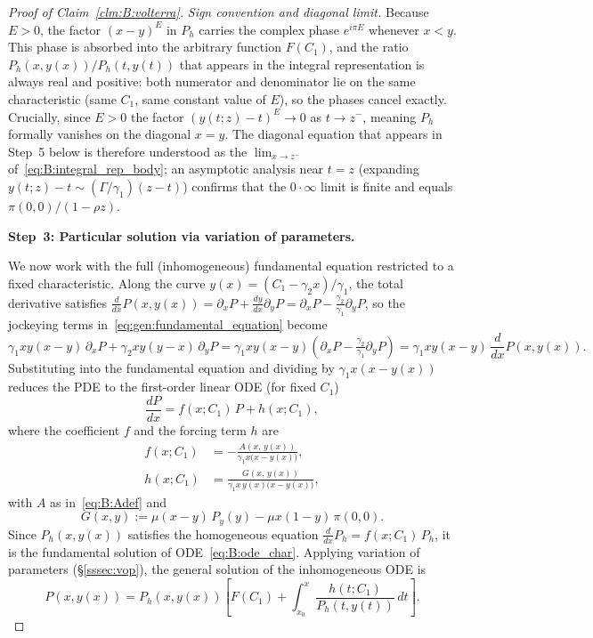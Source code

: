 \begin{proof}[Proof of Claim~\ref{clm:B:volterra}]
\smallskip\noindent\textit{Sign convention and diagonal limit.}
Because $E>0$, the factor $(x-y)^{E}$ in $P_h$ carries the complex phase
$e^{i\pi E}$ whenever $x<y$. This phase is absorbed into the arbitrary function
$F(C_1)$, and the ratio $P_h(x,y(x))/P_h(t,y(t))$ that appears in the integral
representation is always real and positive: both numerator and denominator lie on
the same characteristic (same $C_1$, same constant value of $E$), so the phases
cancel exactly.  Crucially, since $E>0$ the factor $(y(t;z)-t)^E\to0$ as
$t\to z^-$, meaning $P_h$ formally vanishes on the diagonal $x=y$.  The diagonal
equation that appears in Step~5 below is therefore understood as the
$\lim_{x\to z^-}$ of~\eqref{eq:B:integral_rep_body}; an asymptotic analysis near
$t=z$ (expanding $y(t;z)-t\sim(\Gamma/\gamma_1)(z-t)$) confirms that the
$0\cdot\infty$ limit is finite and equals $\pi(0,0)/(1-\rho z)$.

\medskip\noindent\textbf{Step~3: Particular solution via variation of parameters.}

We now work with the full (inhomogeneous) fundamental equation restricted to a
fixed characteristic.  Along the curve $y(x)=(C_1-\gamma_2 x)/\gamma_1$, the
total derivative satisfies $\frac{d}{dx}P(x,y(x)) = \partial_x P + \frac{dy}{dx}\partial_y P = \partial_x P - \frac{\gamma_2}{\gamma_1}\partial_y P$,
so the jockeying terms in~\eqref{eq:gen:fundamental_equation} become
\[
    \gamma_1 xy(x-y)\,\partial_x P + \gamma_2 xy(y-x)\,\partial_y P
    = \gamma_1 xy(x-y)\!\left(\partial_x P - \tfrac{\gamma_2}{\gamma_1}\partial_y P\right)
    = \gamma_1 xy(x-y)\,\frac{d}{dx}P(x,y(x)).
\]
Substituting into the fundamental equation and dividing by $\gamma_1 x(x-y(x))$
reduces the PDE to the first-order linear ODE (for fixed $C_1$)
\begin{equation}
    \frac{dP}{dx} = f(x;C_1)\,P + h(x;C_1),
    \label{eq:B:ode_char}
\end{equation}
where the coefficient $f$ and the forcing term $h$ are
\begin{align}
    f(x;C_1) &= -\frac{A(x,\,y(x))}{\gamma_1 x\bigl(x-y(x)\bigr)},
    \label{eq:B:fdef}\\[4pt]
    h(x;C_1) &= \frac{G(x,\,y(x))}{\gamma_1 x\,y(x)\bigl(x-y(x)\bigr)},
    \label{eq:B:hdef}
\end{align}
with $A$ as in~\eqref{eq:B:Adef} and
\begin{equation}
    G(x,y) := \mu(x-y)\,P_y(y) - \mu x(1-y)\,\pi(0,0).
    \label{eq:B:Gdef}
\end{equation}
Since $P_h(x,y(x))$ satisfies the homogeneous equation
$\frac{d}{dx}P_h = f(x;C_1)\,P_h$, it is the fundamental solution of
ODE~\eqref{eq:B:ode_char}.  Applying variation of parameters (\S\ref{sssec:vop}),
the general solution of the inhomogeneous ODE is
\begin{equation}
    P(x,y(x)) = P_h(x,y(x))\!\left[F(C_1) + \int_{x_0}^{x} \frac{h(t;C_1)}{P_h(t,y(t))}\,dt\right].
    \label{eq:B:variation}
\end{equation}


\end{proof}
